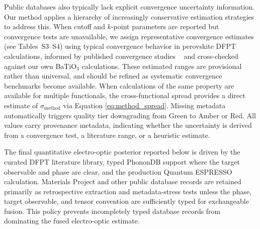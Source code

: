 \documentclass[twocolumn,superscriptaddress,amsmath,amssymb,longbibliography]{revtex4-2}
\newcommand{\meth}{\mathrm{method}}
\begin{document}

Public databases also typically lack explicit convergence uncertainty information. Our method applies a hierarchy of increasingly conservative estimation strategies to address this. When cutoff and $k$-point parameters are reported but convergence tests are unavailable, we assign representative convergence estimates (see Tables~S3--S4) using typical convergence behavior in perovskite DFPT calculations, informed by published convergence studies ~\cite{Ghosez1999,Wahl2008} and cross-checked against our own BaTiO$_3$ calculations.
These estimated ranges are provisional rather than universal, and should be refined as systematic convergence benchmarks become available.
When calculations of the same property are available for multiple functionals, the cross-functional spread provides a direct estimate of $\sigma_\meth$ via Equation \ref{eq:method_spread}. Missing metadata automatically triggers quality tier downgrading from Green to Amber or Red.
All values carry provenance metadata, indicating whether the uncertainty is derived from a convergence test, a literature range, or a heuristic estimate.

The final quantitative electro-optic posterior reported below is driven by the curated DFPT literature library, typed PhononDB support where the target observable and phase are clear, and the production Quantum ESPRESSO calculation. Materials Project and other public database records are retained primarily as retrospective extraction and metadata-stress tests unless the phase, target observable, and tensor convention are sufficiently typed for exchangeable fusion. This policy prevents incompletely typed database records from dominating the fused electro-optic estimate.

\end{document}
